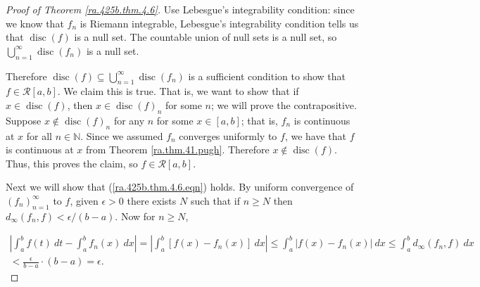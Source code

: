 \begin{proof}[Proof of Theorem \ref{ra.425b.thm.4.6}]

Use Lebesgue's integrability condition: since we know that \(f_n\) is Riemann integrable, Lebesgue's integrability condition tells us that \(\operatorname{disc}(f)\) is a null set. The countable union of null sets is a null set, so \(\bigcup_{n=1}^\infty \operatorname{disc}(f_n)\) is a null set. 

Therefore \(\operatorname{disc}(f) \subseteq \bigcup_{n=1}^\infty \operatorname{disc}(f_n)\) is a sufficient condition to show that \(f \in \mathcal{R}[a,b]\). We claim this is true. That is, we want to show that if \(x \in \operatorname{disc}(f)\), then \(x \in \operatorname{disc}(f)_n\) for some \(n\); we will prove the contrapositive. Suppose \(x \notin \operatorname{disc}(f)_n\) for any \(n\) for some \(x \in [a,b]\); that is, \(f_n\) is continuous at \(x\) for all \(n \in \mathbb{N}\). Since we assumed \(f_n\) converges uniformly to \(f\), we have that \(f\) is continuous at \(x\) from Theorem \ref{ra.thm.41.pugh}. Therefore \(x \notin \operatorname{disc}(f)\). Thus, this proves the claim, so \(f \in \mathcal{R}[a,b]\).

Next we will show that (\ref{ra.425b.thm.4.6.eqn}) holds. By uniform convergence of \((f_n)_{n=1}^\infty\) to \(f\), given \(\epsilon >0\) there exists \(N\) such that if \(n \geq N\) then \(d_\infty (f_n, f) < \epsilon/(b-a)\). Now for \(n \geq N\),

\begin{multline*}
\left|  \int_a^b f(t) \ dt - \int_a^b f_n(x) \ dx \right| = \left|  \int_a^b [f(x) - f_n(x)] \ dx \right|  \leq  \int_a^b  \left|  f(x) - f_n(x) \right| \ dx   \leq  \int_a^b d_\infty(f_n, f)  \ dx 
\\  < \frac{\epsilon}{b-a} \cdot(b-a) = \epsilon.
\end{multline*}

\end{proof}

